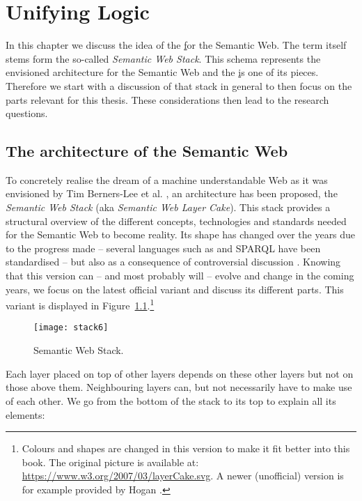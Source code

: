\chapter{Unifying Logic} \label{unilog}

In this chapter we discuss the idea of the \ul for the Semantic Web. The term itself stems form the so-called \emph{Semantic Web Stack}.
This schema represents the envisioned architecture for the Semantic Web and the \ul is one of its pieces.
Therefore we start with a discussion of that stack in general to then focus on the parts relevant for this thesis. These considerations then lead to the research questions.


\section{The architecture of the Semantic Web}
 To concretely realise the dream of a machine understandable Web as it was envisioned by Tim Berners-Lee et al. \cite{SemanticWeb}, 
an architecture has been proposed, the  
 \emph{Semantic Web Stack} (aka \emph{Semantic Web Layer Cake}).
This stack provides a structural overview of the different concepts, technologies and standards needed for the Semantic Web to become reality. 
Its shape has changed over the years \cite{Gerber2} due to the progress made -- several languages such as \rdf \cite{rdf} and SPARQL \cite{sparql} have been standardised
-- but also 
as a consequence of controversial discussion \cite{twotowers,kifer2005}. 
Knowing that this version can -- and most probably will -- evolve and change in the coming years, 
we focus %
on the latest official 
variant %
 and discuss its different parts. This variant is displayed in Figure~\ref{fig:stack}.\footnote{Colours and shapes are changed in this version to make it fit better into this book. 
The original picture is available at: 
\url{https://www.w3.org/2007/03/layerCake.svg}.
A newer (unofficial) version is for example provided by Hogan \cite{hogan}.} 
\begin{figure}[!ht]
	\centering
	\texttt{[image: stack6]}
	\caption[Semantic Web Stack]{Semantic Web Stack.}
	\label{fig:stack}
\end{figure}
Each layer placed on top of other layers  depends on  these other layers but not on those above them. Neighbouring layers can, but not necessarily have to make use of each other. 
We go from the bottom of the stack to its top to explain all its elements:

